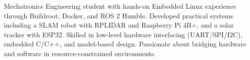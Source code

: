 

\begin{cvparagraph}
Mechatronics Engineering student with hands-on Embedded Linux experience through Buildroot, Docker, and ROS 2 Humble. Developed practical systems including a SLAM robot with RPLIDAR and Raspberry Pi 4B+, and a solar tracker with ESP32. Skilled in low-level hardware interfacing (UART/SPI/I2C), embedded C/C++, and model-based design. Passionate about bridging hardware and software in resource-constrained environments.
\end{cvparagraph}